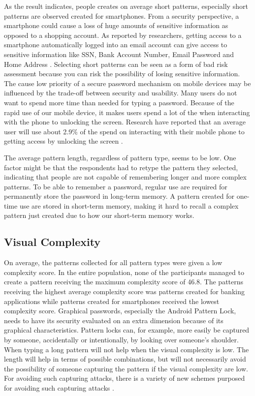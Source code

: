       As the result indicates, people creates on average short patterns, especially short patterns are observed created for smartphones. From a security perspective, a smartphone could cause a loss of huge amounts of sensitive information as opposed to a shopping account. As reported by researchers, getting access to a smartphone automatically logged into an email account can give access to sensitive information like SSN, Bank Account Number, Email Password and Home Address \cite{Egelman}. Selecting short patterns can be seen as a form of bad risk assessment because you can risk the possibility of losing sensitive information. The cause low priority of a secure password mechanism on mobile devices may be influenced by the trade-off between security and usability. Many users do not want to spend more time than needed for typing a password. Because of the rapid use of our mobile device, it makes users spend a lot of the when interacting with the phone to unlocking the screen. Research have reported that an average user will use about 2.9\% of the spend on interacting with their mobile phone to getting access by unlocking the screen \cite{habits3}.

      The average pattern length, regardless of pattern type,  seems to be low. One factor might be that the respondents had to retype the pattern they selected, indicating that people are not capable of remembering longer and more complex patterns. To be able to remember a password, regular use are required for permanently store the password in long-term memory. A pattern created for one-time use are stored in short-term memory, making it hard to recall a complex pattern just created due to how our short-term memory works. 

    \subsection{Visual Complexity}

      On average, the patterns collected for all pattern types were given a low complexity score. In the entire population, none of the participants managed to create a pattern receiving the maximum complexity score of 46.8. The patterns receiving the highest average complexity score was patterns created for banking applications while patterns created for smartphones received the lowest complexity score. Graphical passwords, especially the Android Pattern Lock, needs to have its security evaluated on an extra dimension because of its graphical characteristics. Pattern locks can, for example, more easily be captured by someone, accidentally or intentionally, by looking over someone's shoulder. When typing a long pattern will not help when the visual complexity is low. The length will help in terms of possible combinations, but will not necessarily avoid the possibility of someone capturing the pattern if the visual complexity are low.  For avoiding such capturing attacks, there is a variety of new schemes purposed for avoiding such capturing attacks \cite{Wiedenbeck, IPAS}. 

